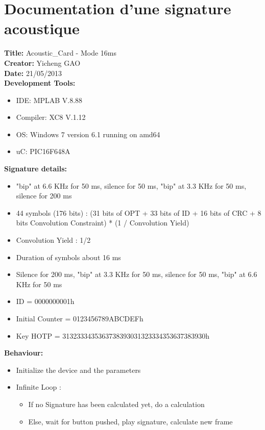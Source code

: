 \documentclass[a4paper,french,12pt]{report}
\begin{document}
\chapter{Documentation d'une signature acoustique}
\label{sign}
\noindent \textbf{Title:} Acoustic\_Card - Mode 16ms\\
\textbf{Creator:} Yicheng GAO\\
\textbf{Date:} 21/05/2013\\

\noindent \textbf{Development Tools:}
\begin{itemize}
\item IDE: MPLAB V.8.88
\item Compiler: XC8 V.1.12
\item OS: Windows 7 version 6.1 running on amd64
\item uC: PIC16F648A\\
\end{itemize}

\noindent \textbf{Signature details:}
\begin{itemize}
\item "bip" at 6.6 KHz for 50 ms, silence for 50 ms, "bip" at 3.3 KHz for 50 ms, silence for 200 ms
\item 44 symbols (176 bits) : (31 bits of OPT + 33 bits of ID + 16 bits of CRC + 8 bits Convolution Constraint) * (1 / Convolution Yield)
\item Convolution Yield : 1/2
\item Duration of symbols about 16 ms
\item Silence for 200 ms, "bip" at 3.3 KHz for 50 ms, silence for 50 ms, "bip" at 6.6 KHz for 50 ms
\item ID = 0000000001h
\item Initial Counter = 0123456789ABCDEFh
\item Key HOTP = 3132333435363738393031323334353637383930h\\
\end{itemize}

\noindent \textbf{Behaviour:}
\begin{itemize}
\item Initialize the device and the parameters 
\item Infinite Loop :
	\begin{itemize}
	\item If no Signature has been calculated yet, do a calculation
	\item Else, wait for button pushed, play signature, calculate new frame\\
	\end{itemize}
\end{itemize}
\end{document}
